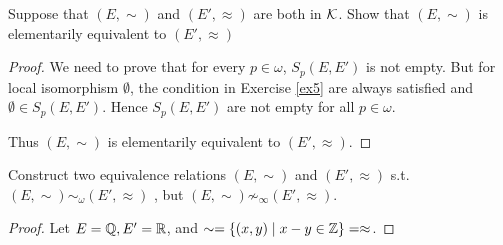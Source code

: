 \documentclass[11pt]{article}
\begin{document}
\begin{exercise}
Suppose that \((E,\sim)\) and \((E',\approx)\) are both in \(\mathcal{K}\). Show that \((E,\sim)\) is elementarily
equivalent to \((E',\approx)\)
\end{exercise}

\begin{proof}
We need to prove that for every \(p\in\omega\), \(S_p(E,E')\) is not empty. But for local
isomorphism \(\emptyset\), the condition in Exercise \ref{ex5} are always satisfied and \(\emptyset\in S_p(E,E')\).
Hence \(S_p(E,E')\) are not empty for all \(p\in\omega\).

Thus \((E,\sim)\) is elementarily equivalent to \((E',\approx)\).
\end{proof}

\begin{exercise}
Construct two equivalence relations \((E,\sim)\) and \((E',\approx)\) s.t. \((E,\sim)\sim_\omega(E',\approx)\) ,
but \((E,\sim)\not\sim_\infty(E',\approx)\).
\end{exercise}

\begin{proof}
Let \(E=\mathbb{Q},E'= \mathbb{R}\), and \(\sim=\{(x,y)\mid x-y\in\mathbb{Z}\}=\approx\).
\end{proof}
\end{document}
